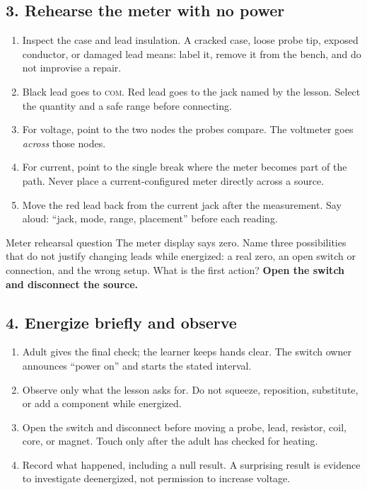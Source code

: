 {\subsection{3. Rehearse the meter with no power}
\begin{enumerate}
\item Inspect the case and lead insulation. A cracked case, loose probe tip, exposed conductor, or damaged lead means: label it, remove it from the bench, and do not improvise a repair.
\item Black lead goes to \textsc{com}. Red lead goes to the jack named by the lesson. Select the quantity and a safe range before connecting.
\item For voltage, point to the two nodes the probes compare. The voltmeter goes \emph{across} those nodes.
\item For current, point to the single break where the meter becomes part of the path. Never place a current-configured meter directly across a source.
\item Move the red lead back from the current jack after the measurement. Say aloud: ``jack, mode, range, placement'' before each reading.
\end{enumerate}
\begin{telospanel}{Meter rehearsal question}
The meter display says zero. Name three possibilities that do not justify changing leads while energized: a real zero, an open switch or connection, and the wrong setup. What is the first action? \textbf{Open the switch and disconnect the source.}
\end{telospanel}

\subsection{4. Energize briefly and observe}
\begin{enumerate}
\item Adult gives the final check; the learner keeps hands clear. The switch owner announces ``power on'' and starts the stated interval.
\item Observe only what the lesson asks for. Do not squeeze, reposition, substitute, or add a component while energized.
\item Open the switch and disconnect before moving a probe, lead, resistor, coil, core, or magnet. Touch only after the adult has checked for heating.
\item Record what happened, including a null result. A surprising result is evidence to investigate deenergized, not permission to increase voltage.
\end{enumerate}

}

